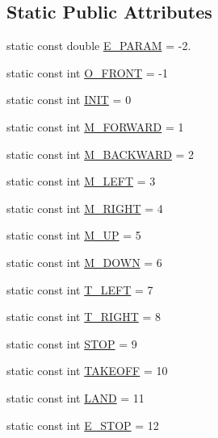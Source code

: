 \subsection*{Static Public Attributes}
\begin{DoxyCompactItemize}
\item 
static const double \hyperlink{class_nymeria_constants_a488dbd431448545861631553325f232f}{E\+\_\+\+P\+A\+R\+A\+M} = -\/2.
\item 
static const int \hyperlink{class_nymeria_constants_aa87e12fdfb03b17586451aedb4ec2306}{O\+\_\+\+F\+R\+O\+N\+T} = -\/1
\item 
static const int \hyperlink{class_nymeria_constants_a33d2a9642320eb2133d25ee1ab4f34bb}{I\+N\+I\+T} = 0
\item 
static const int \hyperlink{class_nymeria_constants_a54920ee4fb6af96103070adc76af3d75}{M\+\_\+\+F\+O\+R\+W\+A\+R\+D} = 1
\item 
static const int \hyperlink{class_nymeria_constants_aba2a411d377034ee75c8dd9c133434ff}{M\+\_\+\+B\+A\+C\+K\+W\+A\+R\+D} = 2
\item 
static const int \hyperlink{class_nymeria_constants_a31b231aa21297903e3649dbf6cf0a3ce}{M\+\_\+\+L\+E\+F\+T} = 3
\item 
static const int \hyperlink{class_nymeria_constants_ab6050897b76c7f6fc3be20f3b0427bcf}{M\+\_\+\+R\+I\+G\+H\+T} = 4
\item 
static const int \hyperlink{class_nymeria_constants_a0a3f82b9c4297f4efc41632f47c1228c}{M\+\_\+\+U\+P} = 5
\item 
static const int \hyperlink{class_nymeria_constants_a71fca6b55d8e77cba3b3c295286849f4}{M\+\_\+\+D\+O\+W\+N} = 6
\item 
static const int \hyperlink{class_nymeria_constants_a78d3f41faf6972cfff257bd489d7f446}{T\+\_\+\+L\+E\+F\+T} = 7
\item 
static const int \hyperlink{class_nymeria_constants_aaec5867264b2ad1c8a62fa96aaf532fe}{T\+\_\+\+R\+I\+G\+H\+T} = 8
\item 
static const int \hyperlink{class_nymeria_constants_ab8ac9bbbff67fa0eee32aa20d97f7148}{S\+T\+O\+P} = 9
\item 
static const int \hyperlink{class_nymeria_constants_ac891f5554d1e296582a583c20e956e51}{T\+A\+K\+E\+O\+F\+F} = 10
\item 
static const int \hyperlink{class_nymeria_constants_a972fe17a5912119f7477e0f0f650aadc}{L\+A\+N\+D} = 11
\item 
static const int \hyperlink{class_nymeria_constants_ac9397ee23a30bf4f57b29d4cfaf39616}{E\+\_\+\+S\+T\+O\+P} = 12

\end{DoxyCompactItemize}
